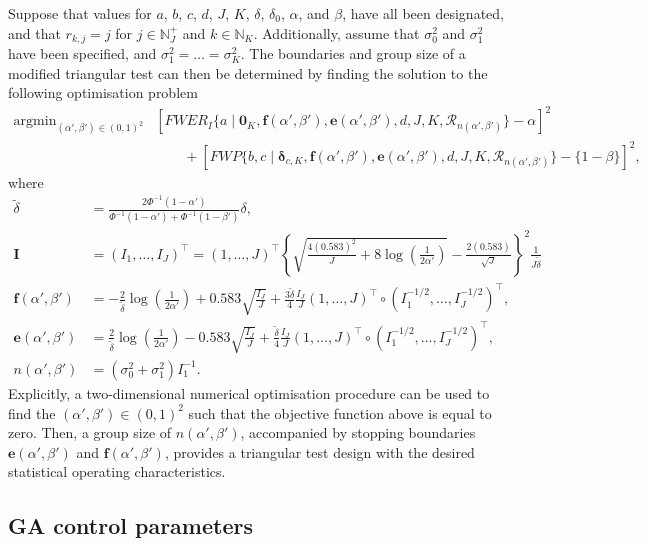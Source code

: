 \documentclass{article}
\numberwithin{equation}{section}
\theoremstyle{plain}
\DeclareMathOperator*{\argmin}{argmin}
\begin{document}
Suppose that values for $a$, $b$, $c$, $d$, $J$, $K$, $\delta$, $\delta_0$, $\alpha$, and $\beta$, have all been designated, and that $r_{k,j}=j$ for $j\in\mathbb{N}_J^+$ and $k\in\mathbb{N}_K$. Additionally, assume that $\sigma_0^2$ and $\sigma_1^2$ have been specified, and $\sigma_{1}^2=\dots=\sigma_K^2$. The boundaries and group size of a modified triangular test can then be determined by finding the solution to the following optimisation problem
\begin{align*}
\argmin_{(\alpha',\beta') \in (0,1)^2} &[FWER_I\{a\mid\boldsymbol{0}_K, \boldsymbol{f}(\alpha',\beta'),\boldsymbol{e}(\alpha',\beta'),d,J,K,\mathscr{R}_{n(\alpha',\beta')}\} - \alpha]^2\\ & \qquad + [FWP\{b,c\mid \boldsymbol{\delta}_{c,K},\boldsymbol{f}(\alpha',\beta'),\boldsymbol{e}(\alpha',\beta'),d,J,K,\mathscr{R}_{n(\alpha',\beta')}\} - \{1-\beta\}]^2,
\end{align*}\label{triang}
where
\begin{align*}
\tilde{\delta} &= \frac{2\Phi^{-1}(1-\alpha')}{\Phi^{-1}(1-\alpha')+\Phi^{-1}(1-\beta')}\delta,\\
\boldsymbol{I} &= (I_1,\dots,I_J)^\top = (1,\dots,J)^\top\left\{\sqrt{\frac{4(0.583)^2}{J} + 8\log\left(\frac{1}{2\alpha'}\right)} - \frac{2(0.583)}{\sqrt{J}}\right\}^2\frac{1}{J\tilde{\delta}}\\
\boldsymbol{f}(\alpha',\beta') &= -\frac{2}{\tilde{\delta}}\log\left(\frac{1}{2\alpha'}\right) + 0.583\sqrt{\frac{I_J}{J}}+\frac{3\tilde{\delta}}{4}\frac{I_J}{J}(1,\dots,J)^\top\circ(I_1^{-1/2},\dots,I_J^{-1/2})^\top,\\
\boldsymbol{e}(\alpha',\beta') &= \frac{2}{\tilde{\delta}}\log\left(\frac{1}{2\alpha'}\right) - 0.583\sqrt{\frac{I_J}{J}}+\frac{\tilde{\delta}}{4}\frac{I_J}{J}(1,\dots,J)^\top\circ(I_1^{-1/2},\dots,I_J^{-1/2})^\top,\\
n(\alpha',\beta') &= (\sigma_0^2+\sigma_1^2)I_1^{-1}.
\end{align*}
Explicitly, a two-dimensional numerical optimisation procedure can be used to find the $(\alpha',\beta')\in(0,1)^2$ such that the objective function above is equal to zero. Then, a group size of $n(\alpha',\beta')$, accompanied by stopping boundaries $\boldsymbol{e}(\alpha',\beta')$ and $\boldsymbol{f}(\alpha',\beta')$, provides a triangular test design with the desired statistical operating characteristics.

\subsection{GA control parameters}
\end{document}

